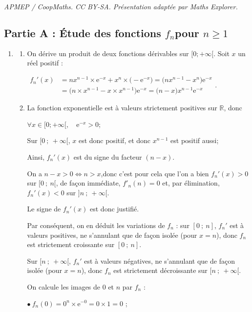 \documentclass[10pt]{article}
\providecommand{\R}{\mathbb{R}}
\providecommand{\e}{{\mathrm{e}}}
\begin{document}
\noindent\textit{APMEP / CoopMaths. CC BY-SA. Présentation adaptée par Maths Explorer.}\par\medskip
\medskip

\subsection*{Partie A : Étude des fonctions \boldmath$f_n$\unboldmath pour \boldmath$n \geqslant 1$\unboldmath}

\begin{enumerate}
\item 
	\begin{enumerate}
		\item On dérive un produit de deux fonctions dérivables sur $[0 ; +\infty[$. Soit $x$ un réel positif :

$\begin{aligned}
f_n'(x) &= nx^{n-1} \times \e^{-x} + x^{n} \times \big(-\e^{-x}\big) = \big(nx^{n-1} - x^{n}\big)\e^{-x} \\
			&= \big(n \times x^{n-1} - x \times x^{n-1}\big)\e^{-x} = \big(n - x\big)x^{n-1}\e^{-x}
		\end{aligned}$.

	\item La fonction exponentielle est à valeurs strictement positives sur $\R$, donc

$\forall x \in [0 ; +\infty[,\quad \e^{-x} > 0$;

Sur $[0~;~+\infty[$, $x$ est donc positif, et donc $x^{n-1}$ est positif aussi;

Ainsi, $f_n'(x)$ est du signe du facteur $(n- x)$.

On a \quad $n - x > 0\iff n > x$,\quad donc c'est pour cela que l'on a bien $f_n'(x) > 0$ sur $[0~;~n[$, de façon immédiate, $f'_n(n) = 0$ et, par élimination, $f_n'(x) < 0$ sur $]n ~;~+\infty[$.

Le signe de $f_n'(x)$ est donc justifié.

Par conséquent, on en déduit les variations de $f_n$ : sur $[0~;~n]$, $f_n'$ est à valeurs positives, ne s'annulant que de façon isolée (pour $x=n$), donc $f_n$ est strictement croissante sur $[0~;~n]$.

Sur $[n~;~+\infty[$, $f_n'$ est à valeurs négatives, ne s'annulant que de façon isolée (pour $x = n$), donc $f_n$ est strictement décroissante sur $[n~;~+\infty[$.

On calcule les images de $0$ et $n$ par $f_n$ :

$\bullet~$$f_n(0) = 0^{n}\times \e^{-0} = 0 \times 1 = 0$ ;


\end{enumerate}
\end{enumerate}
\end{document}
